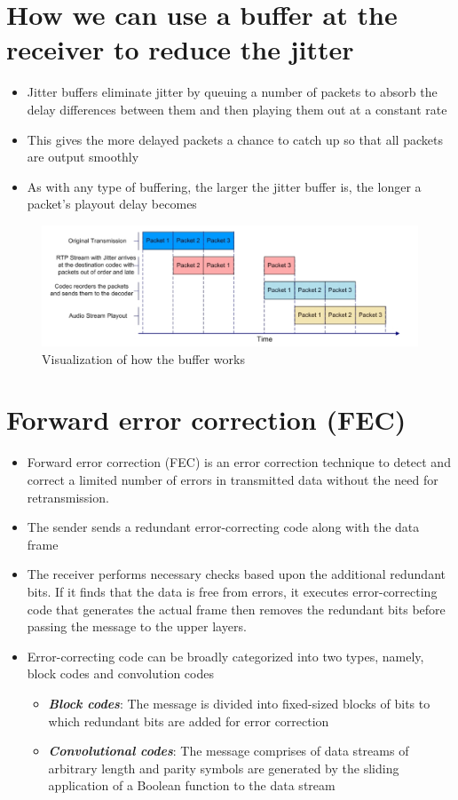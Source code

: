 \documentclass[11pt,a4paper]{article}
\begin{document}
	\section{How we can use a buffer at the receiver to reduce the jitter}
	\begin{itemize}
		\item Jitter buffers eliminate jitter by queuing a number of packets to absorb the delay differences between them and then playing them out at a constant rate
		\item This gives the more delayed packets a chance to catch up so that all packets are output smoothly
		\item As with any type of buffering, the larger the jitter buffer is, the longer a packet's playout delay becomes
	\end{itemize}
	\begin{figure}[h!]
  		\includegraphics[width=\linewidth]{buf-vis.png}
  		\caption{Visualization of how the buffer works}
  		\label{fig:bufvis}
	\end{figure}
	
	\section{Forward error correction (FEC)}
	\begin{itemize}
		\item Forward error correction (FEC) is an error correction technique to detect and correct a limited number of errors in transmitted data without the need for retransmission.
		\item The sender sends a redundant error-correcting code along with the data frame
		\item The receiver performs necessary checks based upon the additional redundant bits. If it finds that the data is free from errors, it executes error-correcting code that generates the actual frame then removes the redundant bits before passing the message to the upper layers.
		\item Error-correcting code can be broadly categorized into two types, namely, block codes and convolution codes
			\begin{itemize}
				\item \textbf{\emph{Block codes}}: The message is divided into fixed-sized blocks of bits to which redundant bits are added for error correction
				\item \textbf{\emph{Convolutional codes}}: The message comprises of data streams of arbitrary length and parity symbols are generated by the sliding application of a Boolean function to the data stream
			\end{itemize}
	\end{itemize}
\end{document}
